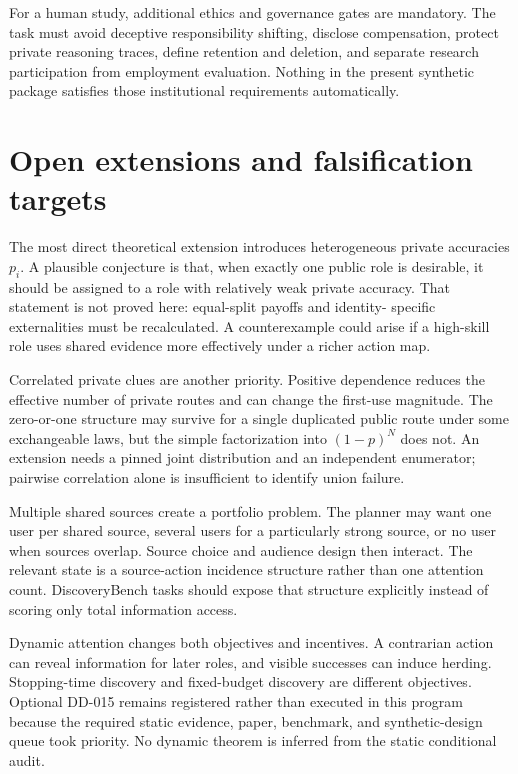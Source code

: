 \documentclass[11pt]{article}
\begin{document}
For a human study, additional ethics and governance gates are mandatory. The
task must avoid deceptive responsibility shifting, disclose compensation,
protect private reasoning traces, define retention and deletion, and separate
research participation from employment evaluation. Nothing in the present
synthetic package satisfies those institutional requirements automatically.

\clearpage
\section{Open extensions and falsification targets}

The most direct theoretical extension introduces heterogeneous private
accuracies $p_i$. A plausible conjecture is that, when exactly one public role
is desirable, it should be assigned to a role with relatively weak private
accuracy. That statement is not proved here: equal-split payoffs and identity-
specific externalities must be recalculated. A counterexample could arise if a
high-skill role uses shared evidence more effectively under a richer action map.

Correlated private clues are another priority. Positive dependence reduces the
effective number of private routes and can change the first-use magnitude. The
zero-or-one structure may survive for a single duplicated public route under
some exchangeable laws, but the simple factorization into $(1-p)^N$ does not.
An extension needs a pinned joint distribution and an independent enumerator;
pairwise correlation alone is insufficient to identify union failure.

Multiple shared sources create a portfolio problem. The planner may want one
user per shared source, several users for a particularly strong source, or no
user when sources overlap. Source choice and audience design then interact.
The relevant state is a source-action incidence structure rather than one
attention count. DiscoveryBench tasks should expose that structure explicitly
instead of scoring only total information access.

Dynamic attention changes both objectives and incentives. A contrarian action
can reveal information for later roles, and visible successes can induce herding.
Stopping-time discovery and fixed-budget discovery are different objectives.
Optional DD-015 remains registered rather than executed in this program because
the required static evidence, paper, benchmark, and synthetic-design queue took
priority. No dynamic theorem is inferred from the static conditional audit.
\end{document}
